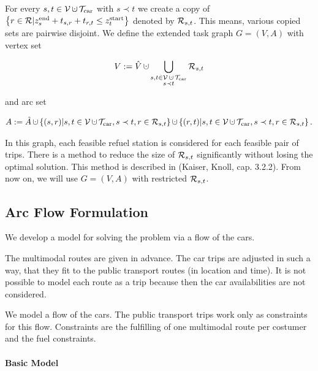\begin{definition}

For every $s,t\in \mathcal{V}\cupdot\Tcar$ with $s\prec t$ we create a copy of $\left\{r\in\mathcal{R}|z^{\operatorname{end}}_s+t_{s,r}+t_{r,t}\leq z^{\operatorname{start}}_t\right\}$ denoted by $\mathcal{R}_{s,t}$. This means, various copied sets are pairwise disjoint. We define the extended task graph $G=(V,A)$ with vertex set

\begin{align*}
	V:=\hat{V}\cupdot\Cupdot_{\substack{s,t\in\mathcal{V}\cupdot\Tcar \\ s\prec t}} \Rst
\end{align*}

and arc set

\begin{align*}
	A:=\hat{A}\cupdot\left\{(s,r)|s,t\in\mathcal{V}\cupdot\Tcar,s\prec t,r\in\Rst\right\}\cupdot\left\{(r,t)|s,t\in\mathcal{V}\cupdot\Tcar,s\prec t,r\in\Rst\right\}.
\end{align*}

In this graph, each feasible refuel station is considered for each feasible pair of trips. There is a method to reduce the size of $\mathcal{R}_{s,t}$ significantly without losing the optimal solution. This method is described in (Kaiser, Knoll, cap. 3.2.2). From now on, we will use $G=(V,A)$ with restricted $\mathcal{R}_{s,t}$.

\end{definition}


\subsection{Arc Flow Formulation}

We develop a model for solving the problem via a flow of the cars.

The multimodal routes are given in advance. The car trips are adjusted in such a way, that they fit to the public transport routes (in location and time). It is not possible to model each route as a trip because then the car availabilities are not considered.

We model a flow of the cars. The public transport trips work only as constraints for this flow. Constraints are the fulfilling of one multimodal route per costumer and the fuel constraints.

\paragraph{Basic Model} \parfill

